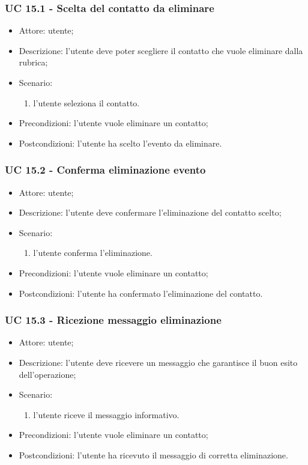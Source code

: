 \subsubsection{UC 15.1 - Scelta del contatto da eliminare} \label{sec: UC 15.1}
\begin{itemize}
    \item Attore: utente;
    \item Descrizione: l'utente deve poter scegliere il contatto che vuole eliminare dalla rubrica;
    \item Scenario:
        \begin{enumerate}
        \item l'utente seleziona il contatto.
        \end{enumerate}
    
    \item Precondizioni: l'utente vuole eliminare un contatto;
    \item Postcondizioni: l'utente ha scelto l'evento da eliminare.
\end{itemize}


\subsubsection{UC 15.2 - Conferma eliminazione evento} \label{sec: UC 15.2}
\begin{itemize}
    \item Attore: utente;
    \item Descrizione: l'utente deve confermare l'eliminazione del contatto scelto;
    \item Scenario:
        \begin{enumerate}
        \item l'utente conferma l'eliminazione.
        \end{enumerate}
    
    \item Precondizioni: l'utente vuole eliminare un contatto;
    \item Postcondizioni: l'utente ha confermato l'eliminazione del contatto.
\end{itemize}


\subsubsection{UC 15.3 - Ricezione messaggio eliminazione} \label{sec: UC 15.3}
\begin{itemize}
    \item Attore: utente;
    \item Descrizione: l'utente deve ricevere un messaggio che garantisce il buon esito dell'operazione;
    \item Scenario:
        \begin{enumerate}
        \item l'utente riceve il messaggio informativo.
        \end{enumerate}
    
    \item Precondizioni: l'utente vuole eliminare un contatto;
    \item Postcondizioni: l'utente ha ricevuto il messaggio di corretta eliminazione.
\end{itemize}